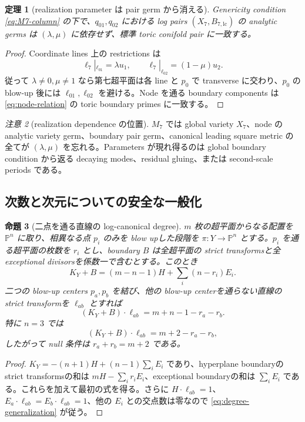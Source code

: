 \documentclass[11pt,a4paper]{ltjsarticle}
\newcommand{\PP}{\mathbb P}\newcommand{\RR}{\mathbb R}\newcommand{\CC}{\mathbb C}
\theoremstyle{plain}
\newtheorem{theorem}{定理}[section]\newtheorem{proposition}[theorem]{命題}
\theoremstyle{definition}
\theoremstyle{remark}
\newtheorem{remark}[theorem]{注意}\newtheorem{warning}[theorem]{警告}
\begin{document}
\begin{theorem}[realization parameter は pair germ から消える]\label{thm:pair-independence}
Genericity condition \cref{eq:M7-column} の下で、$q_{01},q_{02}$ における log pairs $(X_7,B_{7,\mathrm{lc}})$ の analytic germs は $(\lambda,\mu)$ に依存せず、標準 toric conifold pair に一致する。
\end{theorem}

\begin{proof}
Coordinate lines 上の restrictions は
\[
 \ell_7|_{\ell_{01}}=\lambda u_1,
 \qquad
 \ell_7|_{\ell_{02}}=(1-\mu)u_2.
\]
従って $\lambda\ne0,\mu\ne1$ なら第七超平面は各 line と $p_0$ で transverse に交わり、$p_0$ の blow-up 後には $\ell_{01},\ell_{02}$ を避ける。Node を通る boundary components は \cref{eq:node-relation} の toric boundary primes に一致する。
\end{proof}

\begin{remark}[realization dependence の位置]
$M_7$ では global variety $X_7$、node の analytic variety germ、boundary pair germ、canonical leading square metric の全てが $(\lambda,\mu)$ を忘れる。Parameters が現れ得るのは global boundary condition から返る decaying modes、residual gluing、または second-scale periods である。
\end{remark}

\subsection{次数と次元についての安全な一般化}
\begin{proposition}[二点を通る直線の log-canonical degree]\label{prop:degree-generalization}
$m$ 枚の超平面からなる配置を $\PP^n$ に取り、相異なる点 $p_i$ のみを blow upした段階を
$\pi:Y\to\PP^n$ とする。$p_i$ を通る超平面の枚数を $r_i$ とし、boundary $B$ は全超平面の strict transformsと全 exceptional divisorsを係数一で含むとする。このとき
\[
 K_Y+B=(m-n-1)H+\sum_i(n-r_i)E_i.
\]
二つの blow-up centers $p_a,p_b$ を結び、他の blow-up centerを通らない直線の strict transformを $\ell_{ab}$ とすれば
\begin{equation}\label{eq:degree-generalization}
 (K_Y+B)\cdot\ell_{ab}=m+n-1-r_a-r_b.
\end{equation}
特に $n=3$ では
\[
 (K_Y+B)\cdot\ell_{ab}=m+2-r_a-r_b,
\]
したがって null 条件は $r_a+r_b=m+2$ である。
\end{proposition}

\begin{proof}
$K_Y=-(n+1)H+(n-1)\sum_iE_i$ であり、hyperplane boundaryの strict transformsの和は $mH-\sum_ir_iE_i$、exceptional boundaryの和は $\sum_iE_i$ である。これらを加えて最初の式を得る。さらに
$H\cdot\ell_{ab}=1$、$E_a\cdot\ell_{ab}=E_b\cdot\ell_{ab}=1$、他の $E_i$ との交点数は零なので \eqref{eq:degree-generalization} が従う。
\end{proof}
\end{document}
